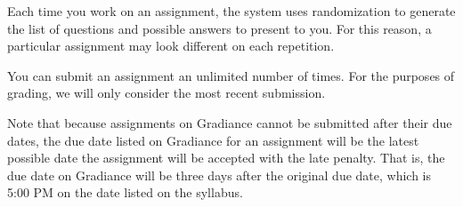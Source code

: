 \documentclass[11pt]{article}
\begin{document}
Each time you work on an assignment, the system uses randomization to
generate the list of questions and possible answers to present to you.
For this reason, a particular assignment may look different on each
repetition.

You can submit an assignment an unlimited number of times.  For the
purposes of grading, we will only consider the most recent submission.

Note that because assignments on Gradiance cannot be submitted after
their due dates, the due date listed on Gradiance for an assignment
will be the latest possible date the assignment will be accepted with
the late penalty.  That is, the due date on Gradiance will be three
days after the original due date, which is 5:00 PM on the date listed
on the syllabus.
\end{document}
